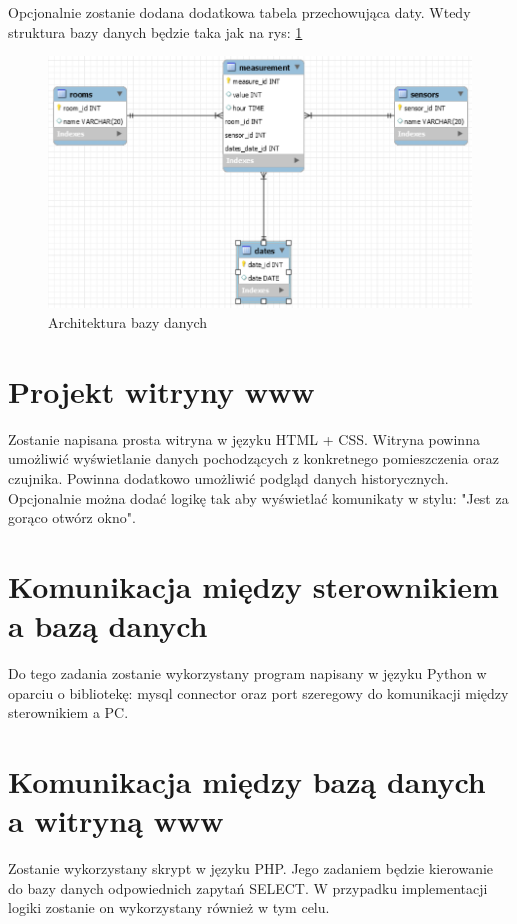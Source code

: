 \documentclass[10pt, a4paper]{article}
\begin{document}
Opcjonalnie zostanie dodana dodatkowa tabela przechowująca daty. Wtedy struktura bazy danych będzie taka jak na rys: \ref{fig:ArchitekturaBD2}

\begin{figure}[H]
	\centering
	\includegraphics[width=1\textwidth]{figures/diag2.png}
	\caption{Architektura bazy danych}
	\label{fig:ArchitekturaBD2}
\end{figure}

\section{Projekt witryny www}
Zostanie napisana prosta witryna w języku HTML + CSS. Witryna powinna umożliwić wyświetlanie danych pochodzących z konkretnego pomieszczenia oraz czujnika. Powinna dodatkowo umożliwić podgląd danych historycznych. Opcjonalnie można dodać logikę tak aby wyświetlać komunikaty w stylu: "Jest za gorąco otwórz okno".
\section{Komunikacja między sterownikiem a bazą danych}
Do tego zadania zostanie wykorzystany program napisany w języku Python w oparciu o bibliotekę: mysql connector \cite{mysql} oraz port szeregowy do komunikacji między sterownikiem a PC.

\section{Komunikacja między bazą danych a witryną www}

Zostanie wykorzystany skrypt w języku PHP. Jego zadaniem będzie kierowanie do bazy danych odpowiednich zapytań SELECT. W przypadku implementacji logiki zostanie on wykorzystany również w tym celu.
\end{document}
